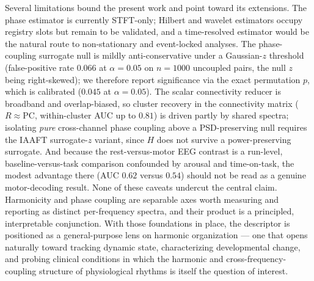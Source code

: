 \documentclass[11pt]{article}
\begin{document}
Several limitations bound the present work and point toward its extensions. The phase estimator is currently STFT-only; Hilbert and wavelet estimators occupy registry slots but remain to be validated, and a time-resolved estimator would be the natural route to non-stationary and event-locked analyses. The phase-coupling surrogate null is mildly anti-conservative under a Gaussian-$z$ threshold (false-positive rate $0.066$ at $\alpha = 0.05$ on $n=1000$ uncoupled pairs, the null $z$ being right-skewed); we therefore report significance via the exact permutation $p$, which is calibrated ($0.045$ at $\alpha=0.05$). The scalar connectivity reducer is broadband and overlap-biased, so cluster recovery in the connectivity matrix ($R \approx \mathrm{PC}$, within-cluster AUC up to $0.81$) is driven partly by shared spectra; isolating \emph{pure} cross-channel phase coupling above a PSD-preserving null requires the IAAFT surrogate-$z$ variant, since $H$ does not survive a power-preserving surrogate. And because the rest-versus-motor EEG contrast is a run-level, baseline-versus-task comparison confounded by arousal and time-on-task, the modest advantage there (AUC $0.62$ versus $0.54$) should not be read as a genuine motor-decoding result. None of these caveats undercut the central claim. Harmonicity and phase coupling are separable axes worth measuring and reporting as distinct per-frequency spectra, and their product is a principled, interpretable conjunction. With those foundations in place, the descriptor is positioned as a general-purpose lens on harmonic organization — one that opens naturally toward tracking dynamic state, characterizing developmental change, and probing clinical conditions in which the harmonic and cross-frequency-coupling structure of physiological rhythms is itself the question of interest.
\end{document}
